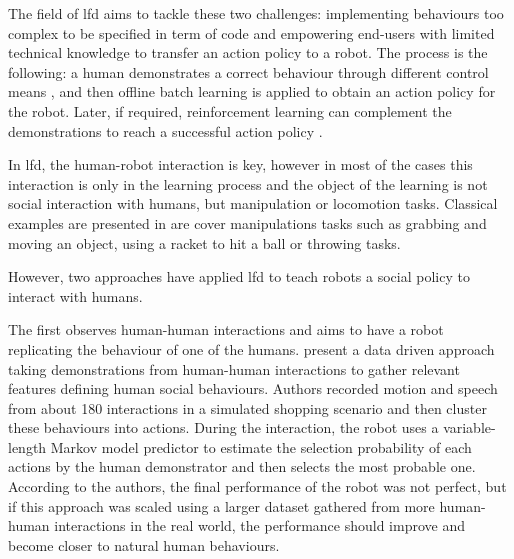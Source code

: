 	    
	The field of \gls{lfd} aims to tackle these two challenges: implementing behaviours too complex to be specified in term of code and empowering end-users with limited technical knowledge to transfer an action policy to a robot. The process is the following: a human demonstrates a correct behaviour through different control means \citep{argall2009survey}, and then offline batch learning is applied to obtain an action policy for the robot. Later, if required, reinforcement learning can complement the demonstrations to reach a successful action policy \citep{billard2008robot}.
	
	In \gls{lfd}, the human-robot interaction is key, however in most of the cases this interaction is only in the learning process and the object of the learning is not social interaction with humans, but manipulation or locomotion tasks. Classical examples are presented in \cite{billard2008robot} are cover manipulations tasks such as grabbing and moving an object, using a racket to hit a ball or throwing tasks.
	
	However, two approaches have applied \gls{lfd} to teach robots a social policy to interact with humans.
	
	The first observes human-human interactions and aims to have a robot replicating the behaviour of one of the humans. \citet{liu2014train} present a data driven approach taking demonstrations from human-human interactions to gather relevant features defining human social behaviours. Authors recorded motion and speech from about 180 interactions in a simulated shopping scenario and then cluster these behaviours into actions. During the interaction, the robot uses a variable-length Markov model predictor to estimate the selection probability of each actions by the human demonstrator and then selects the most probable one. According to the authors, the final performance of the robot was not perfect, but if this approach was scaled using a larger dataset gathered from more human-human interactions in the real world, the performance should improve and become closer to natural human behaviours.
    
